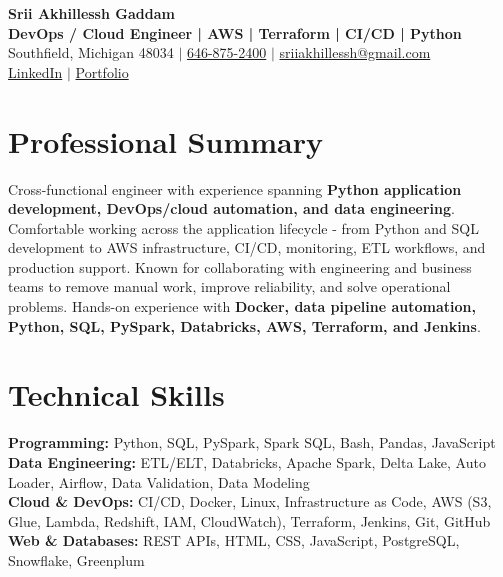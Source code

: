 \documentclass[letterpaper,10pt]{article}
\begin{document}
\fontsize{9.35pt}{10.45pt}\selectfont

\begin{center}
    {\LARGE \textbf{Srii Akhillessh Gaddam}} \\[-1pt]
    \textbf{DevOps / Cloud Engineer | AWS | Terraform | CI/CD | Python} \\[2pt]
    Southfield, Michigan 48034 $|$
    \href{tel:6468752400}{646-875-2400} $|$
    \href{mailto:sriiakhillessh@gmail.com}{sriiakhillessh@gmail.com} \\[1pt]
    \href{https://www.linkedin.com/in/srii-akhiilessh-gaddam-b48668191/}{LinkedIn} $|$
    \href{https://sriiakhillesshg.github.io/portfolio/}{Portfolio}
\end{center}
\vspace{-8pt}

\section{Professional Summary}
\small{Cross-functional engineer with experience spanning \textbf{Python application development, DevOps/cloud automation, and data engineering}. Comfortable working across the application lifecycle - from Python and SQL development to AWS infrastructure, CI/CD, monitoring, ETL workflows, and production support. Known for collaborating with engineering and business teams to remove manual work, improve reliability, and solve operational problems. Hands-on experience with \textbf{Docker, data pipeline automation, Python, SQL, PySpark, Databricks, AWS, Terraform, and Jenkins}.}

\section{Technical Skills}
\small{
\textbf{Programming:} Python, SQL, PySpark, Spark SQL, Bash, Pandas, JavaScript \\
\textbf{Data Engineering:} ETL/ELT, Databricks, Apache Spark, Delta Lake, Auto Loader, Airflow, Data Validation, Data Modeling \\
\textbf{Cloud \& DevOps:} CI/CD, Docker, Linux, Infrastructure as Code, AWS (S3, Glue, Lambda, Redshift, IAM, CloudWatch), Terraform, Jenkins, Git, GitHub \\
\textbf{Web \& Databases:} REST APIs, HTML, CSS, JavaScript, PostgreSQL, Snowflake, Greenplum
}
\end{document}

